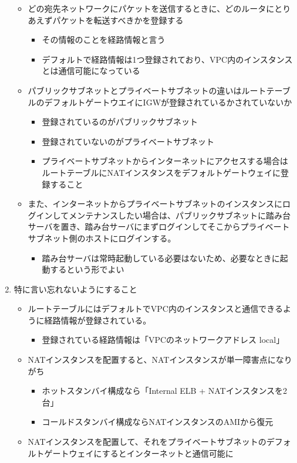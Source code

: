 \documentclass[11pt]{article}
\begin{document}
\begin{enumerate}
\begin{itemize}
\item どの宛先ネットワークにパケットを送信するときに、どのルータにとりあえずパケットを転送すべきかを登録する
\begin{itemize}
\item その情報のことを経路情報と言う
\item デフォルトで経路情報は1つ登録されており、VPC内のインスタンスとは通信可能になっている
\end{itemize}
\item パブリックサブネットとプライベートサブネットの違いはルートテーブルのデフォルトゲートウエイにIGWが登録されているかされていないか
\begin{itemize}
\item 登録されているのがパブリックサブネット
\item 登録されていないのがプライベートサブネット
\item プライベートサブネットからインターネットにアクセスする場合はルートテーブルにNATインスタンスをデフォルトゲートウェイに登録すること
\end{itemize}
\item また、インターネットからプライベートサブネットのインスタンスにログインしてメンテナンスしたい場合は、パブリックサブネットに踏み台サーバを置き、踏み台サーバにまずログインしてそこからプライベートサブネット側のホストにログインする。
\begin{itemize}
\item 踏み台サーバは常時起動している必要はないため、必要なときに起動するという形でよい
\end{itemize}
\end{itemize}
\item 特に言い忘れないようにすること
\begin{itemize}
\item ルートテーブルにはデフォルトでVPC内のインスタンスと通信できるように経路情報が登録されている。
\begin{itemize}
\item 登録されている経路情報は「VPCのネットワークアドレス    local」
\end{itemize}
\item NATインスタンスを配置すると、NATインスタンスが単一障害点になりがち
\begin{itemize}
\item ホットスタンバイ構成なら「Internal ELB + NATインスタンスを2台」
\item コールドスタンバイ構成ならNATインスタンスのAMIから復元
\end{itemize}
\item NATインスタンスを配置して、それをプライベートサブネットのデフォルトゲートウェイにするとインターネットと通信可能に
\end{itemize}
\end{enumerate}
\end{document}
